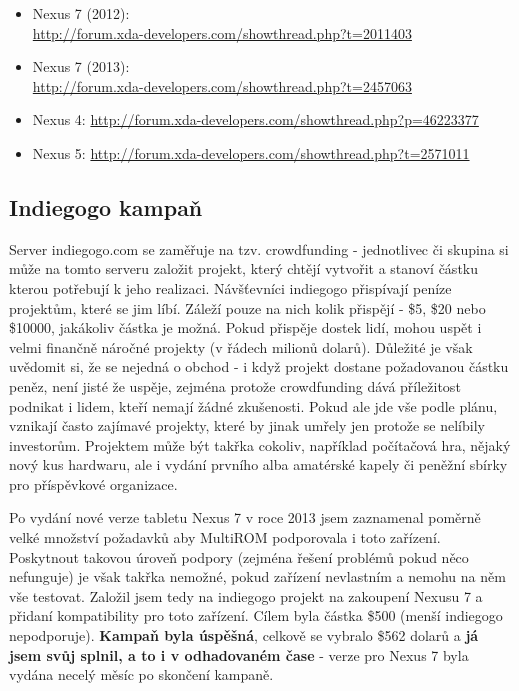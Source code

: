 \documentclass[12pt, a4paper, oneside]{article}
\newcommand{\B}{\textbf} %
\begin{document}
\begin{itemize}
\item Nexus 7 (2012):\\ \url{http://forum.xda-developers.com/showthread.php?t=2011403}
\item Nexus 7 (2013):\\ \url{http://forum.xda-developers.com/showthread.php?t=2457063}
\item Nexus 4: \url{http://forum.xda-developers.com/showthread.php?p=46223377}
\item Nexus 5: \url{http://forum.xda-developers.com/showthread.php?t=2571011}
\end{itemize}

\subsection{Indiegogo kampaň}
Server indiegogo.com\cite{indiegogo} se zaměřuje na tzv. crowdfunding - jednotlivec či skupina si může na tomto serveru založit projekt, který chtějí vytvořit a stanoví částku kterou potřebují k jeho realizaci. Návšťevníci indiegogo přispívají peníze projektům, které se jim líbí. Záleží pouze na nich kolik přispějí - \$5, \$20 nebo \$10000, jakákoliv částka je možná. Pokud přispěje dostek lidí, mohou uspět i velmi finančně náročné projekty (v řádech milionů dolarů). Důležité je však uvědomit si, že se nejedná o obchod - i když projekt dostane požadovanou částku peněz, není jisté že uspěje, zejména protože crowdfunding dává příležitost podnikat i lidem, kteří nemají žádné zkušenosti. Pokud ale jde vše podle plánu, vznikají často zajímavé projekty, které by jinak umřely jen protože se nelíbily investorům. Projektem může být takřka cokoliv, například počítačová hra, nějaký nový kus hardwaru, ale i vydání prvního alba amatérské kapely či peněžní sbírky pro příspěvkové organizace.

Po vydání nové verze tabletu Nexus 7 v roce 2013 jsem zaznamenal poměrně velké množství požadavků aby MultiROM podporovala i toto zařízení. Poskytnout takovou úroveň podpory (zejména řešení problémů pokud něco nefunguje) je však takřka nemožné, pokud zařízení nevlastním a nemohu na něm vše testovat. Založil jsem tedy na indiegogo projekt na zakoupení Nexusu 7 a přidaní kompatibility pro toto zařízení\cite{indiegogo-multirom}. Cílem byla částka \$500 (menší indiegogo nepodporuje). \B{Kampaň byla úspěšná}, celkově se vybralo \$562 dolarů a \B{já jsem svůj  splnil, a to i v odhadovaném čase} - verze pro Nexus 7 byla vydána necelý měsíc po skončení kampaně.
\end{document}
